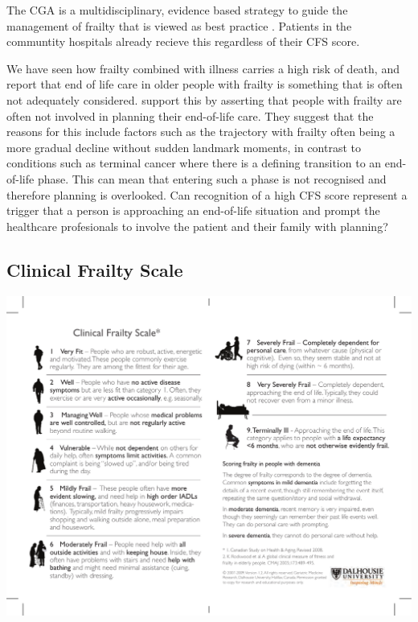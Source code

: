 \documentclass[12pt,a4paper,oneside,titlepage]{article}
\begin{document}
The CGA is a multidisciplinary, evidence based strategy to guide the management 
of frailty that is viewed as best practice \parencite{silver:12, bgs:14, oliver:14}. Patients
in the communtity hospitals already recieve this regardless of their CFS score.

We have seen how frailty combined with illness carries a high risk of death, and 
\textcite{silver:12} report that end of life care in older people with frailty
is something that is often not adequately considered. \textcite{oliver:14} support this
by asserting that people with frailty are often not involved in planning their 
end-of-life care. They suggest that the reasons for this include factors such as
the trajectory with frailty often being a more gradual decline without sudden 
landmark moments, in contrast to conditions such as terminal cancer where there 
is a defining transition to an end-of-life phase. This can mean that entering such a
phase is not recognised and therefore planning is overlooked. Can recognition of 
a high CFS score represent a trigger that a person is approaching an end-of-life
situation and prompt the healthcare profesionals to involve the patient and
their family with planning? 
\clearpage
\printbibliography[prenote=needsfixing]

\clearpage
\begin{appendix}
\section{Clinical Frailty Scale}
\label{appendix:CFS}
\includegraphics[width=\textwidth]{CFS}
\end{appendix}
\end{document}

